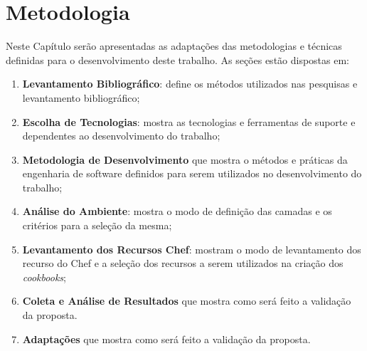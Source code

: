 \newpage\null\thispagestyle{empty}\newpage
\chapter{Metodologia}
\label{chap:metod}

Neste Capítulo serão apresentadas as adaptações das metodologias e técnicas
definidas para o desenvolvimento deste trabalho. As seções estão dispostas
em:

\begin{enumerate}
  \item \textbf{Levantamento Bibliográfico}: define os métodos utilizados nas
    pesquisas e levantamento bibliográfico;
  \item \textbf{Escolha de Tecnologias}: mostra as tecnologias e
    ferramentas de suporte e dependentes ao desenvolvimento do trabalho;
  \item \textbf{Metodologia de Desenvolvimento} que mostra o métodos e práticas da engenharia de software
    definidos para serem utilizados no desenvolvimento do trabalho;
  \item \textbf{Análise do Ambiente}: mostra o modo de definição das camadas e os critérios para
    a seleção da mesma;
  \item \textbf{Levantamento dos Recursos Chef}: mostram o modo de levantamento dos recurso do Chef
    e a seleção dos recursos a serem utilizados na criação dos \textit{cookbooks};
  \item \textbf{Coleta e Análise de Resultados} que mostra como será feito a validação da proposta.
  \item \textbf{Adaptações} que mostra como será feito a validação da proposta.
\end{enumerate}








